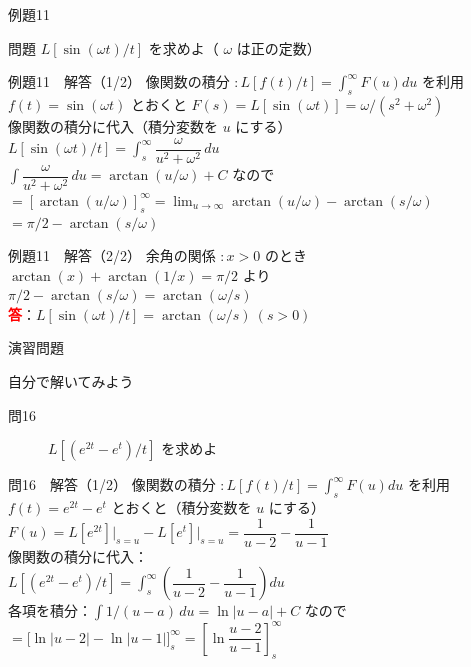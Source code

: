 \documentclass[professionalfonts]{beamer}
\begin{document}
\begin{frame}{例題11}
  \begin{exampleblock}{問題}
    $L[\sin(\omega t)/t]$ を求めよ（ $\omega$ は正の定数）\\[2pt]
  \end{exampleblock}
\end{frame}

\begin{frame}{例題11　解答（1/2）}
  像関数の積分 $: L[f(t)/t] = \int_{s}^\infty F(u)du$ を利用\\[4pt]
  $f(t) = \sin(\omega t)$ とおくと $F(s) = L[\sin(\omega t)] = \omega/(s^{2}+\omega^{2})$\\[4pt]
  像関数の積分に代入（積分変数を $u$ にする）\\[4pt]
  $L[\sin(\omega t)/t] = \int_{s}^\infty \dfrac{\omega}{u^{2}+\omega^{2}}\,du$\\[6pt]
  $\int \dfrac{\omega}{u^{2}+\omega^{2}}\,du = \arctan(u/\omega) + C$ なので\\[4pt]
  $= [\arctan(u/\omega)]_{s}^\infty = \lim_{u\to\infty}\arctan(u/\omega) - \arctan(s/\omega)$\\[4pt]
  $= \pi/2 - \arctan(s/\omega)$
\end{frame}

\begin{frame}{例題11　解答（2/2）}
  余角の関係 $: x > 0$ のとき $\arctan(x) + \arctan(1/x) = \pi/2$ より\\[4pt]
  $\pi/2 - \arctan(s/\omega) = \arctan(\omega/s)$
  \\[8pt]\textcolor{red}{\textbf{答}}：$L[\sin(\omega t)/t] = \arctan(\omega/s) \ (s > 0)$
\end{frame}

\begin{frame}{演習問題}
  \begin{exampleblock}{自分で解いてみよう}
  \begin{description}
    \item[問16] $L[(e^{2t} - e^t)/t]$ を求めよ
  \end{description}
  \end{exampleblock}
\end{frame}

\begin{frame}{問16　解答（1/2）}
  像関数の積分 $: L[f(t)/t] = \int_{s}^\infty F(u)du$ を利用\\[4pt]
  $f(t) = e^{2t} - e^{t}$ とおくと（積分変数を $u$ にする）\\[4pt]
  $F(u) = L[e^{2t}]\big|_{s=u} - L[e^{t}]\big|_{s=u} = \dfrac{1}{u-2} - \dfrac{1}{u-1}$\\[6pt]
  像関数の積分に代入：\\[4pt]
  $L[(e^{2t}-e^{t})/t] = \int_{s}^\infty \left(\dfrac{1}{u-2} - \dfrac{1}{u-1}\right) du$\\[6pt]
  各項を積分：$\int 1/(u-a)\,du = \ln|u-a| + C$ なので\\[4pt]
  $= \big[\ln|u-2| - \ln|u-1|\big]_{s}^\infty = \left[\ln\dfrac{u-2}{u-1}\right]_{s}^\infty$
\end{frame}
\end{document}

